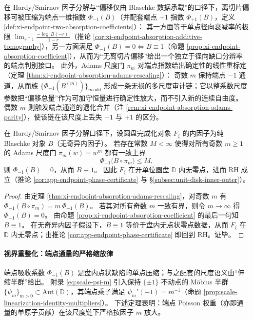 \begin{remark}\label{rem:xi-endpoint-absorption-terminal-index}
在 Hardy/Smirnov 因子分解与“偏移仅由 Blaschke 数据承载”的口径下，离切片偏移可被压缩为端点一维指数 \(\Phi_{-1}(B)\)（并配套端点 \(+1\) 指数 \(\Phi_{+1}(B)\)，定义 \ref{def:xi-endpoint-two-absorption-coefficients}）：
其一方面等于单点径向衰减率的极限 \(\lim_{r\uparrow 1}\frac{-\log|B(-r)|}{1-r}\)（推论 \ref{cor:xi-endpoint-absorption-additive-tomography}），另一方面满足 \(\Phi_{-1}(B)=0\iff B\equiv 1\)（命题 \ref{prop:xi-endpoint-absorption-coefficient}），从而为“无离切片偏移”给出一个独立于径向缺口分辨率的端点判别接口。
此外，Adams 尺度门 \(\pi_m\) 对端点指数给出确定性的线性重标定（定理 \ref{thm:xi-endpoint-absorption-adams-rescaling}）：
奇数 \(m\) 保持端点 \(-1\) 通道，从而族 \(\{\Phi_{-1}(B^{(m)})\}_{m\ \mathrm{odd}}\) 形成一条无损的多尺度审计链；它以整系数尺度参数把“偏移总量”作为可加守恒量进行确定性放大，而不引入新的连续自由度。
偶数 \(m\) 则触发端点通道的退化合并（注 \ref{rem:xi-endpoint-absorption-adams-parity}），使该链在该尺度上丢失 \(-1\) 与 \(+1\) 的区分。
\end{remark}

\begin{theorem}[多尺度一致性 \texorpdfstring{$\Longrightarrow$}{=>} 固定切片承载：奇数 Adams 门端点预算一致上界的充分条件]\label{thm:xi-multiscale-consistency-implies-rh}
在 Hardy/Smirnov 因子分解口径下，设圆盘完成化对象 \(F_\zeta\) 的内因子为纯 Blaschke 对象 \(B\)（无奇异内因子）。
若存在常数 \(M<\infty\) 使得对所有奇数 \(m\ge 1\) 的 Adams 尺度门 \(\pi_m(w)=w^m\) 都有一致上界
\[
\Phi_{-1}\bigl(B\circ \pi_m\bigr)\le M,
\]
则 \(\Phi_{-1}(B)=0\)，从而 \(B\equiv 1\)。
因此 \(F_\zeta\) 在开单位圆盘 \(\mathbb{D}\) 内无零点，进而 RH 成立（推论 \ref{cor:app-endpoint-phase-certificate} 与 \S\ref{subsec:unit-disk-inner-outer}）。
\end{theorem}

\begin{proof}
由定理 \ref{thm:xi-endpoint-absorption-adams-rescaling}，对奇数 \(m\) 有
\(
\Phi_{-1}(B\circ\pi_m)=m\,\Phi_{-1}(B)
\)。
若其对所有奇数 \(m\) 一致有界，则令 \(m\to\infty\) 得 \(\Phi_{-1}(B)=0\)。
由命题 \ref{prop:xi-endpoint-absorption-coefficient} 的最后一句知 \(B\equiv 1\)。
在无奇异内因子假设下，\(B\equiv 1\) 等价于盘内无点状零点数据，从而 \(F_\zeta\) 在 \(\mathbb{D}\) 内无零点；由推论 \ref{cor:app-endpoint-phase-certificate} 即回到 RH。证毕。
\end{proof}

\paragraph{视界重整化：端点通量的严格缩放律}
端点吸收系数 \(\Phi_{-1}(B)\) 是盘内点状缺陷的单点压缩；与之配套的尺度语义由“伸缩半群”给出。
附录 \eqref{eq:scale-psi-m} 引入保持 \(\{\pm 1\}\) 不动点的 Möbius 半群 \(\{\psi_m\}_{m>0}\subset\mathrm{Aut}(\mathbb{D})\)，其端点乘子满足 \(\psi_m'(-1)=m^{-1}\)（命题 \ref{prop:scale-linearization-identity-multipliers}）。
下述定理表明：端点 Poisson 权重（亦即通量的单原子贡献）在该尺度链下严格按因子 \(m\) 放大。

